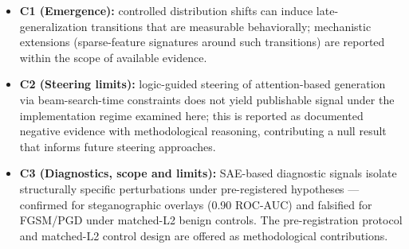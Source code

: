 ﻿\documentclass[../ppgc-tese.tex]{subfiles}
\begin{document}
\begin{itemize}
    \item \textbf{C1 (Emergence):} controlled distribution shifts can induce late-generalization transitions that are measurable behaviorally; mechanistic extensions (sparse-feature signatures around such transitions) are reported within the scope of available evidence.
    \item \textbf{C2 (Steering limits):} logic-guided steering of attention-based generation via beam-search-time constraints does not yield publishable signal under the implementation regime examined here; this is reported as documented negative evidence with methodological reasoning, contributing a null result that informs future steering approaches.
    \item \textbf{C3 (Diagnostics, scope and limits):} SAE-based diagnostic signals isolate structurally specific perturbations under pre-registered hypotheses --- confirmed for steganographic overlays (0.90 ROC-AUC) and falsified for FGSM/PGD under matched-L2 benign controls. The pre-registration protocol and matched-L2 control design are offered as methodological contributions.
\end{itemize}
\end{document}
